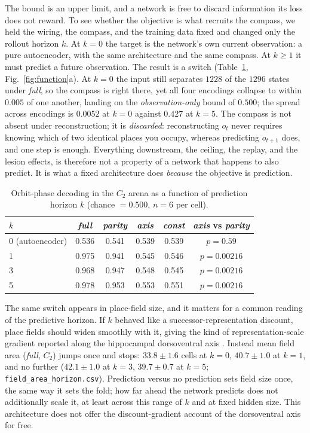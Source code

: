 The bound is an upper limit, and a network is free to discard information its loss does not reward. To
see whether the objective is what recruits the compass, we held the wiring, the compass, and the
training data fixed and changed only the rollout horizon $k$. At $k=0$ the target is the network's own
current observation: a pure autoencoder, with the same architecture and the same compass. At $k\ge1$ it
must predict a future observation. The result is a switch (Table~\ref{tab:horizon}, Fig.~\ref{fig:function}a). At
$k=0$ the input still separates $1228$ of the $1296$ states under \textit{full}, so the compass is right
there, yet all four encodings collapse to within $0.005$ of one another, landing on the
\emph{observation-only} bound of $0.500$; the spread across encodings is $0.0052$ at $k=0$ against
$0.427$ at $k=5$. The compass is not absent under reconstruction; it is \emph{discarded}: reconstructing
$o_t$ never requires knowing which of two identical places you occupy, whereas predicting $o_{t+1}$ does,
and one step is enough. Everything downstream, the ceiling, the replay, and the lesion effects, is
therefore not a property of a network that happens to also predict. It is what a fixed architecture
does \emph{because} the objective is prediction.

\begin{table}[t]
\centering
\caption{Orbit-phase decoding in the $C_2$ arena as a function of prediction horizon $k$
(chance $= 0.500$, $n = 6$ per cell).}
\label{tab:horizon}
\begin{tabular}{lccccc}
\toprule
$k$ & \textit{full} & \textit{parity} & \textit{axis} & \textit{const} & \textit{axis} vs \textit{parity} \\
\midrule
0 (autoencoder) & 0.536 & 0.541 & 0.539 & 0.539 & $p = 0.59$ \\
1 & 0.975 & 0.941 & 0.545 & 0.546 & $p = 0.00216$ \\
3 & 0.968 & 0.947 & 0.548 & 0.545 & $p = 0.00216$ \\
5 & 0.978 & 0.953 & 0.553 & 0.551 & $p = 0.00216$ \\
\bottomrule
\end{tabular}
\end{table}

The same switch appears in place-field size, and it matters for a common reading of the predictive
horizon. If $k$ behaved like a successor-representation discount, place fields should widen smoothly
with it, giving the kind of representation-scale gradient reported along the hippocampal dorsoventral
axis \citep{kjelstrup2008}. Instead mean field area (\textit{full}, $C_2$) jumps once and stops:
$33.8 \pm 1.6$ cells at $k=0$, $40.7 \pm 1.0$ at $k=1$, and no further ($42.1 \pm 1.0$ at $k=3$,
$39.7 \pm 0.7$ at $k=5$; \texttt{field\_area\_horizon.csv}). Prediction versus no prediction sets field
size once, the same way it sets the fold; how far ahead the network predicts does not additionally
scale it, at least across this range of $k$ and at fixed hidden size. This architecture does not offer
the discount-gradient account of the dorsoventral axis for free.

